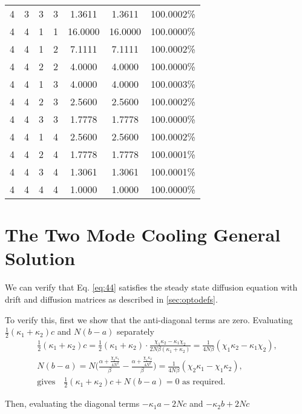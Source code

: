 \documentclass[11pt,a4paper]{article}
\numberwithin{equation}{section}
\begin{document}
\begin{appendices}
\begin{center}
\begin{tabular}{cccc|cc|c}
			4 & 3 & 3 & 3 & 1.3611 & 1.3611 & 100.0002\% \\
			4 & 4 & 1 & 1 & 16.0000 & 16.0000 & 100.0000\% \\
			4 & 4 & 1 & 2 & 7.1111 & 7.1111 & 100.0002\% \\
			4 & 4 & 2 & 2 & 4.0000 & 4.0000 & 100.0000\% \\
			4 & 4 & 1 & 3 & 4.0000 & 4.0000 & 100.0003\% \\
			4 & 4 & 2 & 3 & 2.5600 & 2.5600 & 100.0002\% \\
			4 & 4 & 3 & 3 & 1.7778 & 1.7778 & 100.0000\% \\
			4 & 4 & 1 & 4 & 2.5600 & 2.5600 & 100.0002\% \\
			4 & 4 & 2 & 4 & 1.7778 & 1.7778 & 100.0001\% \\
			4 & 4 & 3 & 4 & 1.3061 & 1.3061 & 100.0001\% \\
			4 & 4 & 4 & 4 & 1.0000 & 1.0000 & 100.0000\% \\
			\hline
		\end{tabular}
	\end{center}
		\section{The Two Mode Cooling General Solution}
	\label{sec:verifyappen}
	
	We can verify that Eq. \ref{eq:44} satisfies the steady state diffusion equation with drift and diffusion matrices as described in \ref{sec:optodefs}.
	
	To verify this, first we show that the anti-diagonal terms are zero. Evaluating $\frac{1}{2}(\kappa_1 + \kappa_2)c$ and $N(b-a)$ separately
	\begin{align*}
	&\frac{1}{2}(\kappa_1 + \kappa_2) c = \frac{1}{2}(\kappa_1 + \kappa_2) \cdot \frac{\chi_1 \kappa_2 - \kappa_1 \chi_2}{2N\beta (\kappa_1+\kappa_2)} = \frac{1}{4N\beta}(\chi_1 \kappa_2 - \kappa_1 \chi_2),&\\
	&N(b-a)= N \Big(\frac{\alpha + \frac{\chi_2 \kappa_1}{4N^2}}{\beta} -\frac{\alpha + \frac{\chi_1 \kappa_2}{4N^2}}{\beta}\Big) = \frac{1}{4N\beta}(\chi_2 \kappa_1 - \chi_1 \kappa_2),&\\
	&\text{gives}\quad\frac{1}{2}(\kappa_1 + \kappa_2)c + N(b-a) = 0\text{ as required.}&
	\end{align*}
	
	Then, evaluating the diagonal terms $-\kappa_1 a - 2Nc$ and $-\kappa_2 b + 2Nc$
	

\end{appendices}
\end{document}
